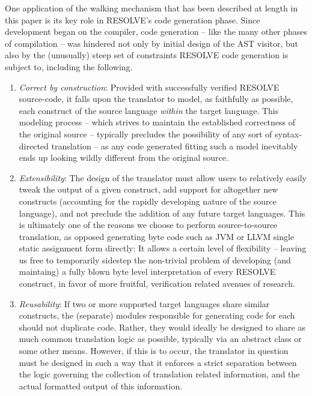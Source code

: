 \documentclass[times]{speauth}
\begin{document}
One application of the walking mechanism that has been described at length in this paper is its key role in RESOLVE's code generation phase. Since development began on the compiler, code generation -- like the many other phases of compilation -- was hindered not only by initial design of the AST visitor, but also by the (unusually) steep set of constraints RESOLVE code generation is subject to, including the following.

\begin{enumerate}
\item \textit{Correct by construction}: Provided with successfully verified RESOLVE source-code, it falls upon the translator to model, as faithfully as possible, each construct of the source language \textit{within} the target language. This modeling process -- which strives to maintain the established correctness of the original source -- typically precludes the possibility of any sort of syntax-directed translation -- as any code generated fitting such a model inevitably ends up looking wildly different from the original source.
\item \textit{Extensibility}: The design of the translator must allow users to relatively easily tweak the output of a given construct, add support for altogether new constructs (accounting for the rapidly developing nature of the source language), and not preclude the addition of any future target languages. This is ultimately one of the reasons we choose to perform source-to-source translation, as opposed generating byte code such as JVM or LLVM single static assignment form directly: It allows a certain level of flexibility -- leaving us free to temporarily sidestep the non-trivial problem of developing (and maintaing) a fully blown byte level interpretation of every RESOLVE construct, in favor of more fruitful, verification related avenues of research.
\item \textit{Reusability}: If two or more supported target languages share similar constructs, the (separate) modules responsible for generating code for each should not duplicate code. Rather, they would ideally be designed to share as much common translation logic as possible, typically via an abstract class or some other means. However, if this is to occur, the translator in question must be designed in such a way that it enforces a strict separation between the logic governing the collection of translation related information, and the actual formatted output of this information.
\end{enumerate}
\end{document}
